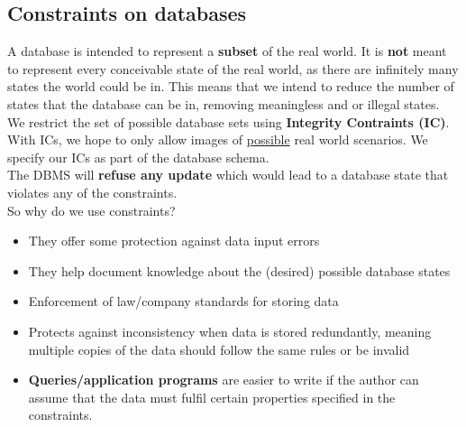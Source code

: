 \documentclass{article}
\begin{document}
\subsection*{Constraints on databases}
A database is intended to represent a \textbf{subset} of the real world. It is \textbf{not} meant to represent every conceivable state of the real world, as there are infinitely many states the world could be in. This means that we intend to reduce the number of states that the database can be in, removing meaningless and or illegal states.
\\We restrict the set of possible database sets using \textbf{Integrity Contraints (IC)}. With ICs, we hope to only allow images of \underline{possible} real world scenarios. We specify our ICs as part of the database schema.
\\The DBMS will \textbf{refuse any update} which would lead to a database state that violates any of the constraints.
\\So why do we use constraints?
\begin{itemize}
    \item They offer some protection against data input errors
    \item They help document knowledge about the (desired) possible database states
    \item Enforcement of law/company standards for storing data
    \item Protects against inconsistency when data is stored redundantly, meaning multiple copies of the data should follow the same rules or be invalid
    \item \textbf{Queries/application programs} are easier to write if the author can assume that the data must fulfil certain properties specified in the constraints.
\end{itemize}
\end{document}
